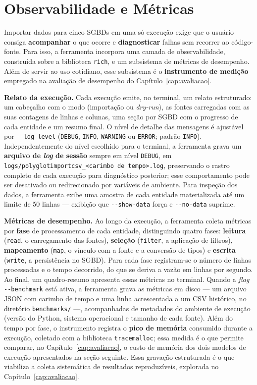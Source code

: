 \section{Observabilidade e Métricas}
\label{sec:observabilidade}

Importar dados para cinco SGBDs em uma só execução exige que o usuário consiga
\textbf{acompanhar} o que ocorre e \textbf{diagnosticar} falhas sem recorrer ao
código-fonte. Para isso, a ferramenta incorpora uma camada de observabilidade,
construída sobre a biblioteca \texttt{rich}, e um subsistema de métricas de desempenho.
Além de servir ao uso cotidiano, esse subsistema é o \textbf{instrumento de medição}
empregado na avaliação de desempenho do Capítulo~\ref{cap:avaliacao}.

\textbf{Relato da execução.} Cada execução emite, no terminal, um relato estruturado:
um cabeçalho com o modo (importação ou \textit{dry-run}), as fontes carregadas com as
suas contagens de linhas e colunas, uma seção por SGBD com o progresso de cada entidade e
um resumo final. O nível de detalhe das mensagens é ajustável por
\texttt{-{}-log-level} (\texttt{DEBUG}, \texttt{INFO}, \texttt{WARNING} ou
\texttt{ERROR}; padrão \texttt{INFO}). Independentemente do nível escolhido para o
terminal, a ferramenta grava um \textbf{arquivo de \textit{log} de sessão} sempre em
nível \texttt{DEBUG}, em \texttt{logs/polyglotimportcsv\_\textless carimbo de
tempo\textgreater.log}, preservando o rastro completo de cada execução para diagnóstico
posterior; esse comportamento pode ser desativado ou redirecionado por variáveis de
ambiente. Para inspeção dos dados, a ferramenta exibe uma amostra de cada entidade
materializada até um limite de 50 linhas --- exibição que \texttt{-{}-show-data} força
e \texttt{-{}-no-data} suprime.

\textbf{Métricas de desempenho.} Ao longo da execução, a ferramenta coleta métricas por
\textbf{fase} de processamento de cada entidade, distinguindo quatro fases:
\textbf{leitura} (\texttt{read}, o carregamento das fontes), \textbf{seleção}
(\texttt{filter}, a aplicação de filtros), \textbf{mapeamento} (\texttt{map}, o vínculo
com a fonte e a conversão de tipos) e \textbf{escrita} (\texttt{write}, a persistência no
SGBD). Para cada fase registram-se o número de linhas processadas e o tempo decorrido, do
que se deriva a vazão em linhas por segundo. Ao final, um quadro-resumo apresenta essas
métricas no terminal. Quando a \textit{flag} \texttt{-{}-benchmark} está ativa, a
ferramenta grava as métricas em disco --- um arquivo JSON com carimbo de tempo e uma
linha acrescentada a um CSV histórico, no diretório \texttt{benchmarks/} ---, acompanhadas
de metadados do ambiente de execução (versão do Python, sistema operacional e tamanho de
cada fonte). Além do tempo por fase, o instrumento registra o \textbf{pico de memória}
consumido durante a execução, coletado com a biblioteca \texttt{tracemalloc}; essa medida
é o que permite comparar, no Capítulo~\ref{cap:avaliacao}, o custo de memória dos dois
modelos de execução apresentados na seção seguinte. Essa gravação estruturada é o que
viabiliza a coleta sistemática de resultados reproduzíveis, explorada no
Capítulo~\ref{cap:avaliacao}.


